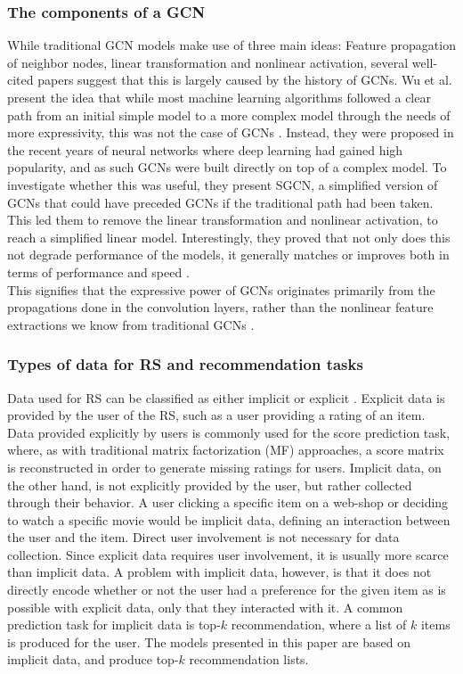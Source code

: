 \subsubsection*{The components of a GCN}
While traditional GCN models make use of three main ideas: Feature propagation of neighbor nodes, linear transformation and nonlinear activation, several well-cited papers \cite{SimplifyingGCN,LightGCN,HeteGCN} suggest that this is largely caused by the history of GCNs.
Wu et al. present the idea that while most machine learning algorithms followed a clear path from an initial simple model to a more complex model through the needs of more expressivity, this was not the case of GCNs \cite{SimplifyingGCN}.
Instead, they were proposed in the recent years of neural networks where deep learning had gained high popularity, and as such GCNs were built directly on top of a complex model.
To investigate whether this was useful, they present SGCN, a simplified version of GCNs that could have preceded GCNs if the traditional path had been taken.
This led them to remove the linear transformation and nonlinear activation, to reach a simplified linear model.
Interestingly, they proved that not only does this not degrade performance of the models, it generally matches or improves both in terms of performance and speed \cite{SimplifyingGCN}.\\
This signifies that the expressive power of GCNs originates primarily from the propagations done in the convolution layers, rather than the nonlinear feature extractions we know from traditional GCNs \cite{SimplifyingGCN}.

\subsubsection*{Types of data for RS and recommendation tasks}
Data used for RS can be classified as either implicit or explicit \cite{oard1998implicit}.
Explicit data is provided by the user of the RS, such as a user providing a rating of an item.
Data provided explicitly by users is commonly used for the score prediction task, where, as with traditional matrix factorization (MF) approaches, a score matrix is reconstructed in order to generate missing ratings for users.
Implicit data, on the other hand, is not explicitly provided by the user, but rather collected through their behavior.
A user clicking a specific item on a web-shop or deciding to watch a specific movie would be implicit data, defining an interaction between the user and the item.
Direct user involvement is not necessary for data collection.
Since explicit data requires user involvement, it is usually more scarce than implicit data.
A problem with implicit data, however, is that it does not directly encode whether or not the user had a preference for the given item as is possible with explicit data, only that they interacted with it.
A common prediction task for implicit data is top-$k$ recommendation, where a list of $k$ items is produced for the user.
The models presented in this paper are based on implicit data, and produce top-$k$ recommendation lists. 

